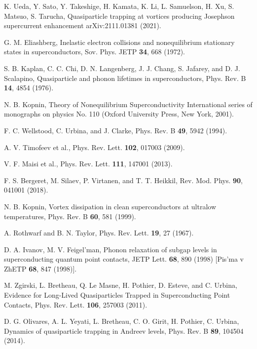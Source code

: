 \documentclass[prx,twocolumn,aps,superscriptaddress,showpacs,amsmath,amssymb,footnoteinbib]{revtex4-1}
\begin{document}
\begin{thebibliography}{99}
K. Ueda, Y. Sato, Y. Takeshige, H. Kamata, K. Li, L. Samuelson, H. Xu, S. Matsuo, S. Tarucha,
Quasiparticle trapping at vortices producing Josephson supercurrent enhancement
arXiv:2111.01381 (2021).

G. M. Eliashberg, Inelastic electron collisions and nonequilibrium
stationary states in superconductors, Sov. Phys. JETP \textbf{34},
668 (1972). %

S. B. Kaplan, C. C. Chi, D. N. Langenberg, J. J. Chang, S.
Jafarey, and D. J. Scalapino, Quasiparticle and phonon lifetimes
in superconductors, Phys. Rev. B \textbf{14}, 4854 (1976).

N. B. Kopnin, Theory of Nonequilibrium Superconductivity
International series of monographs on physics No. 110 (Oxford
University Press, New York, 2001).

F. C. Wellstood, C. Urbina, and J. Clarke, Phys. Rev. B
\textbf{49}, 5942 (1994).

A. V. Timofeev et al., Phys. Rev. Lett. \textbf{102}, 017003
(2009).

V. F. Maisi et al., Phys. Rev. Lett. \textbf{111}, 147001 (2013).

F. S. Bergeret, M. Silaev, P. Virtanen, and T. T. Heikkil, Rev.
Mod. Phys. \textbf{90}, 041001 (2018).

N. B. Kopnin, Vortex dissipation in clean superconductors at
ultralow temperatures, Phys. Rev. B \textbf{60}, 581 (1999).

A. Rothwarf and B. N. Taylor, Phys. Rev. Lett. \textbf{19}, 27
(1967).

D. A. Ivanov, M. V. Feigel'man, Phonon relaxation of subgap levels
in superconducting quantum point contacts, JETP Lett. \textbf{68},
890 (1998) [Pis'ma v ZhETP \textbf{68}, 847 (1998)].

M. Zgirski, L. Bretheau, Q. Le Masne, H. Pothier, D. Esteve, and
C. Urbina, Evidence for Long-Lived Quasiparticles Trapped in
Superconducting Point Contacts, Phys. Rev. Lett. \textbf{106},
257003 (2011).

D. G. Olivares, A. L. Yeyati, L. Bretheau, C. O. Girit, H.
Pothier,  C. Urbina, Dynamics of quasiparticle trapping in Andreev
levels, Phys. Rev. B \textbf{89}, 104504 (2014).


\end{thebibliography}
\end{document}
